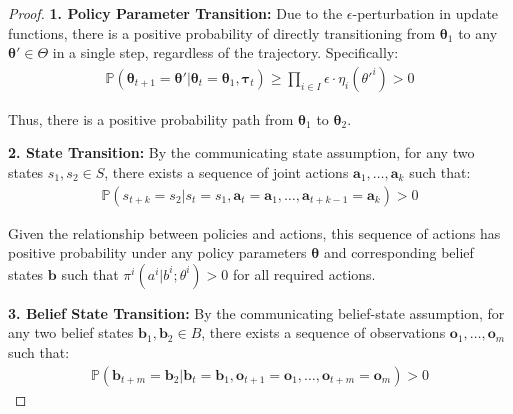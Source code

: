 \begin{proof}
    \textbf{1. Policy Parameter Transition:} Due to the
    $\epsilon$-perturbation in update functions, there is a positive probability of
    directly transitioning from $\boldsymbol{\theta}_{1}$ to any $\boldsymbol{\theta}
        ' \in \Theta$ in a single step, regardless of the trajectory. Specifically:
    \begin{align}
        \mathbb{P}(\boldsymbol{\theta}_{t+1}=\boldsymbol{\theta}'|\boldsymbol{\theta}_{t}=\boldsymbol{\theta}_{1}, \boldsymbol{\tau}_{t}) \geq \prod_{i \in I}\epsilon \cdot \eta_{i}(\theta'^{i}) > 0
    \end{align}

    Thus, there is a positive probability path from $\boldsymbol{\theta}_{1}$ to
    $\boldsymbol{\theta}_{2}$.

    \textbf{2. State Transition:} By the communicating
    state assumption, for any two states $s_{1}, s_{2} \in S$, there exists a
    sequence of joint actions $\boldsymbol{a}_{1}, \ldots, \boldsymbol{a}_{k}$
    such that:
    \begin{align}
        \mathbb{P}(s_{t+k}=s_{2}|s_{t}=s_{1}, \boldsymbol{a}_{t}=\boldsymbol{a}_{1}, \ldots, \boldsymbol{a}_{t+k-1}=\boldsymbol{a}_{k}) > 0
    \end{align}

    Given the relationship between policies and actions, this sequence of actions has
    positive probability under any policy parameters $\boldsymbol{\theta}$ and corresponding
    belief states $\boldsymbol{b}$ such that $\pi^{i}(a^{i}|b^{i}; \theta^{i}) > 0$
    for all required actions.

    \textbf{3. Belief State Transition:} By the communicating belief-state
    assumption, for any two belief states $\boldsymbol{b}_{1}, \boldsymbol{b}_{2} \in
        B$, there exists a sequence of observations
    $\boldsymbol{o}_{1}, \ldots, \boldsymbol{o}_{m}$ such that:
    \begin{align}
        \mathbb{P}(\boldsymbol{b}_{t+m}=\boldsymbol{b}_{2}|\boldsymbol{b}_{t}=\boldsymbol{b}_{1}, \boldsymbol{o}_{t+1}=\boldsymbol{o}_{1}, \ldots, \boldsymbol{o}_{t+m}=\boldsymbol{o}_{m}) > 0
    \end{align}


\end{proof}
